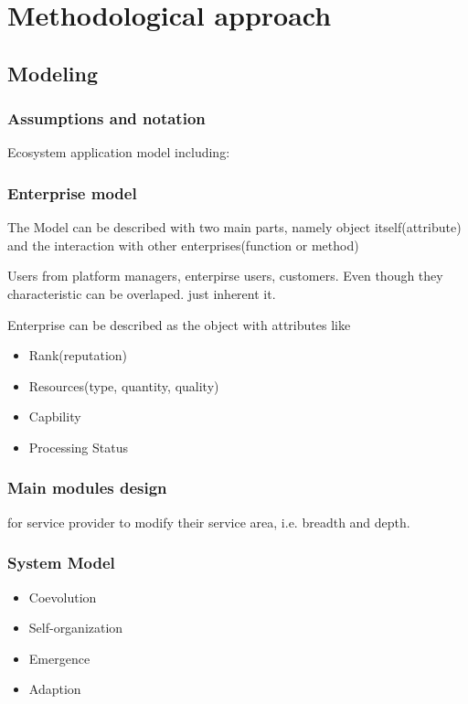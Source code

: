 \section{Methodological approach} %
\label{sec:methodological_approach}

\subsection{Modeling} %
\label{sub:modeling}

\subsubsection{Assumptions and notation}

Ecosystem application model including:
\subsubsection{Enterprise model}

The Model can be described with two main parts, namely object itself(attribute) and the interaction with other enterprises(function or method)

Users from platform managers, enterpirse users, customers. Even though they characteristic can be overlaped. just inherent it.

Enterprise can be described as the object with attributes like 
\begin{itemize}
	\item Rank(reputation)
	\item Resources(type, quantity, quality)
	\item Capbility
	\item Processing Status
\end{itemize}

\subsubsection{Main modules design}
\label{subsub:main_modules}
for service provider to modify their service area, i.e. breadth and depth.

\subsubsection{System Model}
\begin{itemize}
	\item Coevolution
	\item Self-organization
	\item Emergence	
	\item Adaption
\end{itemize}

